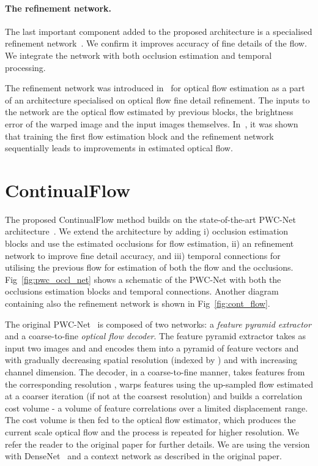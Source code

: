 \documentclass[runningheads]{llncs}
\begin{document}
\paragraph{\bf The refinement network.} The last important component added to the proposed architecture is a specialised refinement network~\cite{Ilg2016,Pang2017}.
We confirm it improves accuracy of fine details of the flow. We integrate the network with both occlusion estimation and temporal processing.


The refinement network was introduced in~\cite{Ilg2016} for optical flow estimation as a part of an architecture specialised on optical flow fine detail refinement.
The inputs to the network are the optical flow estimated by previous blocks, the brightness error of the warped image and the input images themselves.
In~\cite{Ilg2016,Pang2017}, it was shown that training the first flow estimation block and the refinement network sequentially leads to improvements in estimated optical flow.

 


\section{ContinualFlow}
\label{sec:proposed}
The proposed ContinualFlow method builds on the state-of-the-art  PWC-Net architecture~\cite{Sun2017}. We extend the architecture by adding i) occlusion estimation blocks and use the estimated occlusions for flow estimation, ii) an refinement network to improve fine detail accuracy, and iii)  temporal connections for utilising the previous flow for estimation of both the flow and the occlusions. Fig~\ref{fig:pwc_occl_net} shows a schematic of the PWC-Net with both the occlusions estimation blocks and temporal connections. Another diagram containing also the refinement network is shown in Fig~\ref{fig:cont_flow}.

The original PWC-Net~\cite{Sun2017} is composed of two networks: a {\it feature pyramid extractor} and a coarse-to-fine {\it optical flow decoder}.
The feature pyramid extractor takes as input two images  and  and encodes them into a pyramid of feature vectors  and  with gradually decreasing spatial resolution (indexed by ) and with increasing channel dimension. The decoder, in a coarse-to-fine manner, takes features from the corresponding resolution , warps features  using the up-sampled flow  estimated at a coarser iteration  (if not at the coarsest resolution) and builds a correlation cost volume - a volume of feature correlations over a limited displacement range. The cost volume is then fed to the optical flow estimator, which produces the current scale optical flow  and the process is repeated for higher resolution. We refer the reader to the original paper for further details. We are using the version with DenseNet~\cite{Huang2016} and a context network as described in the original paper.
\end{document}
